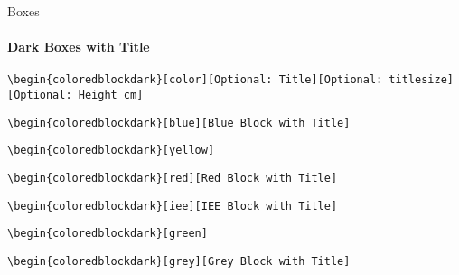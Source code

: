 \documentclass[aspectratio=169]{beamer}
\begin{document}
\begin{frame}{Boxes}
    \framesubtitle{Dark Boxes with Title}

    \footnotesize\centering\texttt{\textbackslash begin\{coloredblockdark\}[color][Optional:~Title][Optional:~titlesize][Optional:~Height cm]}
    
    \begin{minipage}[t]{0.49\textwidth}
    
        \begin{coloredblockdark}
            \texttt{\textbackslash begin\{coloredblockdark\}[blue][Blue Block with Title]}\strut
        \end{coloredblockdark}

        \begin{coloredblockdark}
            \texttt{\textbackslash begin\{coloredblockdark\}[yellow]}\strut
        \end{coloredblockdark}

        \begin{coloredblockdark}
            \texttt{\textbackslash begin\{coloredblockdark\}[red][Red Block with Title]}\strut
        \end{coloredblockdark}
        
    \end{minipage}
    \hfill
    \begin{minipage}[t]{0.49\textwidth}
    
        \begin{coloredblockdark}
            \texttt{\textbackslash begin\{coloredblockdark\}[iee][IEE Block with Title]}\strut
        \end{coloredblockdark}

        \begin{coloredblockdark}
            \texttt{\textbackslash begin\{coloredblockdark\}[green]}\strut
        \end{coloredblockdark}

        \begin{coloredblockdark}
            \texttt{\textbackslash begin\{coloredblockdark\}[grey][Grey Block with Title]}\strut
        \end{coloredblockdark}
        
    \end{minipage}
\end{frame}
\end{document}
